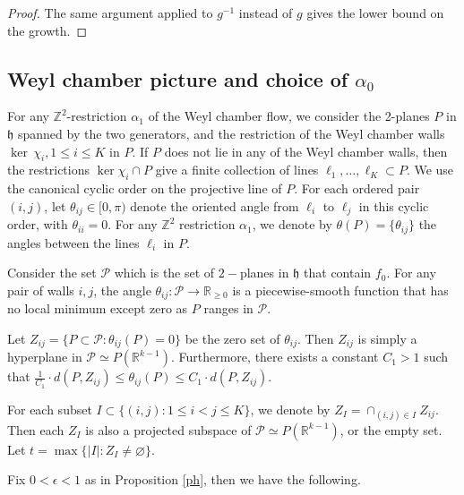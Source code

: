 \documentclass[11pt]{amsart}
\numberwithin{equation}{section}
\newcommand{\R}{\mathbb{R}}
\newcommand{\Z}{\mathbb{Z}}
\theoremstyle{plain}
\begin{document}
\begin{proof}
 The same argument applied to $g^{-1}$ instead of $g$ gives the lower bound on the growth.
\end{proof}

\subsection{Weyl chamber picture and choice of $\alpha_0$}\label{sec:weylchamchoice}

For any $\Z^2$-restriction $\alpha_1$ of the Weyl chamber flow, we consider the 2-planes $P$ in $\mathfrak h$ spanned by the two generators, and the restriction of the Weyl chamber walls $\ker \,\chi_i,1\le i\le K$ in $P$. If $P$ does not lie in any of the Weyl chamber walls, then the restrictions
$\ker\chi_i\cap P$ give a finite collection of lines
$\ell_1,\ldots,\ell_K\subset P$.
We use the canonical cyclic order on the projective line of $P$. For each ordered pair $(i,j)$, let $\theta_{ij}\in[0,\pi)$ denote the oriented angle
from $\ell_i$ to $\ell_j$ in this cyclic order, with $\theta_{ii}=0$. For any $\Z^2$ restriction $\alpha_1$, we denote by $\theta(P)=\{\theta_{ij}\}$ the angles between the lines $\ell_i$ in $P$.

Consider the set $\mathcal P$ which is the set of $2-$planes in $\mathfrak{h}$ that contain $f_0$. For any pair of walls $i,j$, the angle $\theta_{ij}:\mathcal P\to \R_{\ge 0}$ is a piecewise-smooth function that has no local minimum except zero as $P$ ranges in $\mathcal P$. 

Let $Z_{ij}=\{P\subset \mathcal{P}:\theta_{ij}(P)=0\}$ be the zero set of $\theta_{ij}$. Then $Z_{ij}$ is simply a hyperplane in $\mathcal{P}\simeq P(\R^{k-1})$. Furthermore, there exists a constant $C_1>1$ such that $\frac{1}{C_1}\cdot d(P,Z_{ij})\le \theta_{ij}(P)\le C_1\cdot d(P,Z_{ij})$.

For each subset $I\subset \{(i,j): 1\le i<j\le K\}$, we denote by $Z_I=\cap_{(i,j)\in I}Z_{ij}$. Then each $Z_I$ is also a projected subspace of $\mathcal{P}\simeq P(\R^{k-1})$, or the empty set. Let $t=\max\{|I|:Z_I\neq \varnothing\}$.

Fix $0<\epsilon<1$ as in Proposition \ref{ph}, then we have the following.
\end{document}
